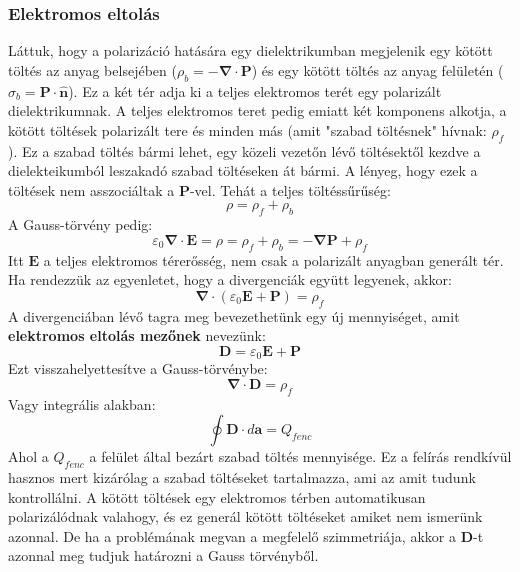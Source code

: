 \documentclass[../main.tex]{subfiles}
\begin{document}
\subsubsection{Elektromos eltolás}
Láttuk, hogy a polarizáció hatására egy dielektrikumban megjelenik egy kötött töltés az anyag belsejében ($\rho_b = - \boldsymbol{\nabla} \cdot \mathbf{P}$) és egy kötött töltés az anyag
felületén ($\sigma_b = \mathbf{P} \cdot \hat{\mathbf{n}}$). Ez a két tér adja ki a teljes elektromos terét egy polarizált dielektrikumnak. A teljes elektromos teret pedig emiatt két komponens
alkotja, a kötött töltések polarizált tere és minden más (amit "szabad töltésnek" hívnak: $\rho_f$). Ez a szabad töltés bármi lehet, egy közeli vezetőn lévő töltésektől kezdve a dielekteikumból leszakadó szabad töltéseken át bármi.
A lényeg, hogy ezek a töltések nem asszociáltak a $\mathbf{P}$-vel. Tehát a teljes töltéssűrűség:
\begin{equation}
    \rho = \rho_f + \rho_b
\end{equation}
A Gauss-törvény pedig:
\begin{equation}
    \varepsilon_0 \boldsymbol{\nabla} \cdot \mathbf{E} = \rho = \rho_f + \rho_b = - \boldsymbol{\nabla} \mathbf{P} + \rho_f
\end{equation} 
Itt $\mathbf{E}$ a teljes elektromos térerősség, nem csak a polarizált anyagban generált tér. Ha rendezzük az egyenletet, hogy a divergenciák együtt legyenek, akkor:
\begin{equation}
    \boldsymbol{\nabla} \cdot (\varepsilon_0 \mathbf{E} + \mathbf{P}) = \rho_f
\end{equation}
A divergenciában lévő tagra meg bevezethetünk egy új mennyiséget, amit \textbf{elektromos eltolás mezőnek} nevezünk:
\begin{equation}
    \boxed{\mathbf{D} = \varepsilon_0 \mathbf{E} + \mathbf{P}}
\end{equation}
Ezt visszahelyettesítve a Gauss-törvénybe:
\begin{equation}
    \boxed{\boldsymbol{\nabla} \cdot \mathbf{D} = \rho_f}
\end{equation}
Vagy integrális alakban:
\begin{equation}
    \oint \mathbf{D} \cdot d\mathbf{a} = Q_{fenc}
\end{equation}
Ahol a $Q_{fenc}$ a felület által bezárt szabad töltés mennyisége. Ez a felírás rendkívül hasznos mert kizárólag a szabad töltéseket tartalmazza, ami az amit tudunk kontrollálni.
A kötött töltések egy elektromos térben automatikusan polarizálódnak valahogy, és ez generál kötött töltéseket amiket nem ismerünk azonnal. De ha a problémának megvan a megfelelő szimmetriája,
akkor a $\mathbf{D}$-t azonnal meg tudjuk határozni a Gauss törvényből.
\end{document}
